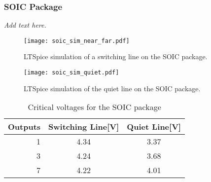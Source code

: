 \documentclass[../main.tex]{subfiles}
\begin{document}
\subsubsection{SOIC Package}

\textit{Add text here.}
\lipsum[2]

\begin{figure}[h]
    \centering
    \texttt{[image: soic\_sim\_near\_far.pdf]}
    \caption{LTSpice simulation of a switching line on the SOIC package.}
    \label{fig:soic_sim_near_far}
\end{figure}

\newpage

\begin{figure}[h]
    \centering
    \texttt{[image: soic\_sim\_quiet.pdf]}
    \caption{LTSpice simulation of the quiet line on the SOIC package.}
    \label{fig:soic_sim_quiet}
\end{figure}

\newpage

\begin{table}[h]
    \centering
    \begin{tabular}{r|c c}
        \toprule[1pt]
        \textbf{Outputs} & \textbf{Switching Line[V]} &\textbf{Quiet Line[V]} \\
        \midrule
        1  & 4.34  & 3.37 \\
        3  & 4.24  & 3.68 \\
        7  & 4.22  & 4.01  \\
        \bottomrule[1pt]
    \end{tabular}
    \caption{Critical voltages for the SOIC package}
\end{table}
\end{document}
